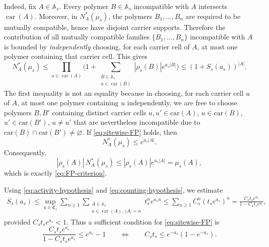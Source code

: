 \documentclass[dvipsnames,a4paper]{article}
\numberwithin{equation}{section}
\theoremstyle{definition}
\theoremstyle{remark}
\begin{document}
Indeed, fix \(A\in\mathbb A_s\). Every polymer \(B \in \mathbb A_s\) incompatible with \(A\) intersects
\(\operatorname{car}(A)\). Moreover, in \(N_A^*(\mu_s)\), the polymers
\(B_1,\dots,B_n\) are required to be mutually compatible, hence have disjoint carrier
supports. Therefore the contribution of all mutually compatible families
\(\{B_1,\dots,B_n\}\) incompatible with \(A\) is bounded by \emph{independently} choosing, for
each carrier cell of \(A\), at most one polymer containing that carrier cell. This gives
\begin{equation}
	N_A^*(\mu_s)
	\le
	\prod_{u\in\operatorname{car}(A)}
	\Biggl(
	1+
	\sum_{\substack{B\in\mathbb A_s\\ u\in\operatorname{car}(B)}}
	|\rho_s(B)|e^{a_s|B|}
	\Biggr)
	\le
	(1+S_s(a_s))^{|A|}.
	\label{eq:NA-star-site-bound}
\end{equation}
The first inequality is not an equality because in choosing, for each carrier cell $u$ of $A$, at most one polymer containing $u$ independently, we are free to choose polymers $B, B'$ containing distinct carrier cells $u,u'\in \mathrm{car}(A)$, $u\in\mathrm{car}(B)$, $u'\in\mathrm{car}(B')$, $u \ne u'$ that are nevertheless incompatible due to $\mathrm{car}(B) \cap \mathrm{car}(B') \ne \varnothing$. If \eqref{eq:sitewise-FP} holds, then
\begin{equation}
N_A^*(\mu_s)\le e^{a_s|A|}.
\end{equation}
Consequently,
\begin{equation}
|\rho_s(A)|\,N_A^*(\mu_s)
\le
|\rho_s(A)|e^{a_s|A|}
=
\mu_s(A),
\end{equation}
which is exactly \eqref{eq:FP-criterion}.

Using \eqref{eq:activity-hypothesis} and \eqref{eq:counting-hypothesis}, we estimate
\begin{align}
	S_s(a_s)
	\le
	\sup_{u\in\mathfrak C_s}
	\sum_{n\ge 1}
	\sum_{\substack{A\in\mathbb A_s\\
			u\in\operatorname{car}(A),\ |A|=n}}
	t_s^n e^{a_s n}
	\le
	\sum_{n\ge 1}
	C_s^n(t_s e^{a_s})^n
	=
	\frac{C_s t_s e^{a_s}}{1-C_s t_s e^{a_s}},
	\label{eq:sitewise-series}
\end{align}
provided \(C_s t_s e^{a_s}<1\). Thus a sufficient condition for
\eqref{eq:sitewise-FP} is
\begin{equation}
	\frac{C_s t_s e^{a_s}}{1-C_s t_s e^{a_s}}
	\le
	e^{a_s}-1
	\qquad\Leftrightarrow\qquad
	C_s t_s \le e^{-a_s}(1-e^{-a_s}).
	\label{eq:main-low-activity-condition}
\end{equation}
\end{document}
